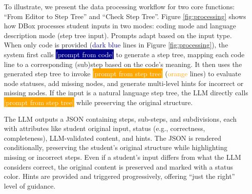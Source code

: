 
To illustrate, we present the data processing workflow for two core functions: ``From Editor to Step Tree'' and ``Check Step Tree''. Figure \ref{fig:processing} shows how DBox processes student inputs in two modes: coding mode and language description mode (step tree input). Prompts adapt based on the input type. When only code is provided (\textcolor{darkblue}{dark blue} lines in Figure \ref{fig:processing}), the system first calls \colorbox{darkblue}{\textcolor{white}{[prompt from code]}} to generate a step tree, mapping each code line to a corresponding (sub)step based on the code’s meaning. It then uses the generated step tree to invoke \colorbox{orange}{\textcolor{white}{[prompt from step tree]}} (\textcolor{orange}{orange} lines) to evaluate node statuses, add missing nodes, and generate multi-level hints for incorrect or missing nodes. If the input is a natural language step tree, the LLM directly calls \colorbox{orange}{\textcolor{white}{[prompt from step tree]}} while preserving the original structure. 

The LLM outputs a JSON containing steps, sub-steps, and subdivisions, each with attributes like student original input, status (e.g., correctness, completeness), LLM-validated content, and hints. The JSON is rendered conditionally, preserving the student’s original structure while highlighting missing or incorrect steps. Even if a student's input differs from what the LLM considers correct, the original content is preserved and marked with a status color. Hints are provided and triggered progressively, offering ``just the right'' level of guidance.



